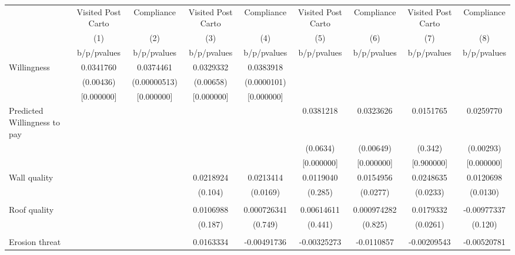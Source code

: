 {
\def\sym#1{\ifmmode^{#1}\else\(^{#1}\)\fi}
\begin{tabular}{l*{8}{c}}
\toprule
                &\multicolumn{1}{c}{Visited Post Carto}&\multicolumn{1}{c}{Compliance}&\multicolumn{1}{c}{Visited Post Carto}&\multicolumn{1}{c}{Compliance}&\multicolumn{1}{c}{Visited Post Carto}&\multicolumn{1}{c}{Compliance}&\multicolumn{1}{c}{Visited Post Carto}&\multicolumn{1}{c}{Compliance}\\
                &\multicolumn{1}{c}{(1)}&\multicolumn{1}{c}{(2)}&\multicolumn{1}{c}{(3)}&\multicolumn{1}{c}{(4)}&\multicolumn{1}{c}{(5)}&\multicolumn{1}{c}{(6)}&\multicolumn{1}{c}{(7)}&\multicolumn{1}{c}{(8)}\\
                &b/p/pvalues&b/p/pvalues&b/p/pvalues&b/p/pvalues&b/p/pvalues&b/p/pvalues&b/p/pvalues&b/p/pvalues\\
\midrule
Willingness     &0.0341760&0.0374461&0.0329332&0.0383918&         &         &         &         \\
                &(0.00436)&(0.00000513)&(0.00658)&(0.0000101)&         &         &         &         \\
                &[0.000000]&[0.000000]&[0.000000]&[0.000000]&         &         &         &         \\
Predicted Willingness to pay&         &         &         &         &0.0381218&0.0323626&0.0151765&0.0259770\\
                &         &         &         &         & (0.0634)&(0.00649)&  (0.342)&(0.00293)\\
                &         &         &         &         &[0.000000]&[0.000000]&[0.900000]&[0.000000]\\
Wall quality    &         &         &0.0218924&0.0213414&0.0119040&0.0154956&0.0248635&0.0120698\\
                &         &         &  (0.104)& (0.0169)&  (0.285)& (0.0277)& (0.0233)& (0.0130)\\
                &         &         &         &         &         &         &         &         \\
Roof quality    &         &         &0.0106988&0.000726341&0.00614611&0.000974282&0.0179332&-0.00977337\\
                &         &         &  (0.187)&  (0.749)&  (0.441)&  (0.825)& (0.0261)&  (0.120)\\
                &         &         &         &         &         &         &         &         \\
Erosion threat  &         &         &0.0163334&-0.00491736&-0.00325273&-0.0110857&-0.00209543&-0.00520781\\

\end{tabular}}
